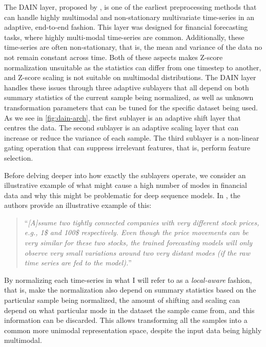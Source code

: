\documentclass{statsmsc}
\begin{document}
{The \ac{DAIN} layer, proposed by \cite{dain}, is one of the earliest preprocessing methods that can
handle highly multimodal and non-stationary multivariate time-series in an adaptive,
end-to-end fashion.
This layer was designed for financial forecasting tasks, where highly multi-modal
time-series are common. Additionally, these time-series are often non-stationary, that is, the
mean and variance of the data no not remain constant across time.
Both of these aspects makes Z-score normalization unsuitable as the statistics can differ
from one timestep to another, and Z-score scaling is not suitable on multimodal distributions.
The \ac{DAIN} layer handles these issues through three adaptive sublayers that all depend
on both summary statistics of the current sample being normalized, as well as unknown transformation
parameters that can be tuned for the specific dataset being used.
As we see in \cref{fig:dain-arch}, the first sublayer is an adaptive shift layer
that centres the data. The second sublayer is an adaptive scaling layer that can increase or
reduce the variance of each sample. The third sublayer is a non-linear gating operation
that can suppress irrelevant features, that is, perform feature selection.

Before delving deeper into how exactly the sublayers operate, we consider an illustrative
example of what might cause a high number of modes in financial data and why this might
be problematic for deep sequence models. In
\cite{dain}, the authors provide an illustrative example of this:
\begin{quote}
    ``\textit{[A]ssume two tightly
    connected companies with very different stock prices, e.g., 1\$
    and 100\$ respectively. Even though the price movements can
    be very similar for these two stocks, the trained forecasting
    models will only observe very small variations around two
    very distant modes (if the raw time series are fed to the model).}''
\end{quote}
By normalizing each time-series in what I will refer to as a
\textit{local-aware} fashion, that is, make the normalization also depend on summary statistics
based on the particular sample being normalized,
the amount of shifting and scaling can depend on what particular mode in the dataset the sample
came from, and this information can be discarded. This allows transforming all the samples into
a common more unimodal representation space, despite the input data being highly multimodal.

}
\end{document}

